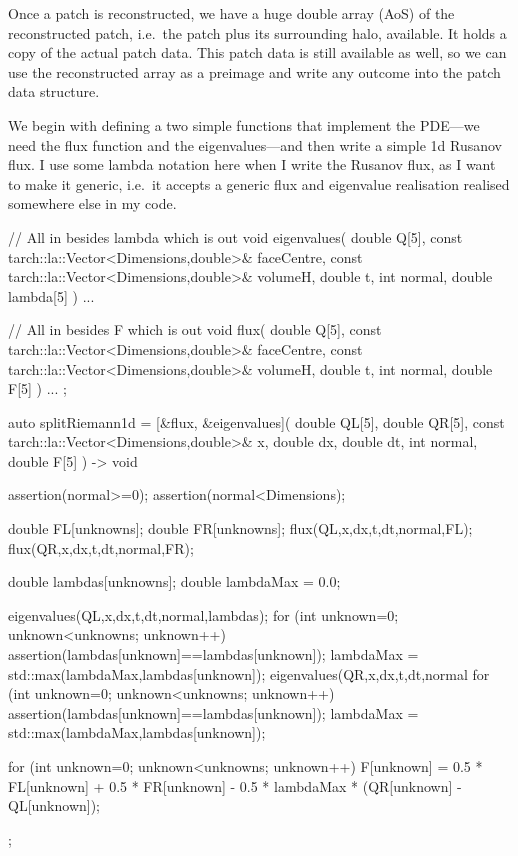 Once a patch is reconstructed, we have a huge double array (AoS) of the
reconstructed patch, i.e.~the patch plus its surrounding halo, available.
It holds a copy of the actual patch data.
This patch data is still available as well, so we can use the reconstructed
array as a preimage and write any outcome into the patch data structure.


We begin with defining a two simple functions that implement the PDE---we
need the flux function and the eigenvalues---and then write a simple 1d Rusanov flux.
I use some lambda notation here when I write the Rusanov flux, as I want to
make it generic, i.e.~it accepts a generic flux and eigenvalue realisation
realised somewhere else in my code. 




\begin{code}
// All in besides lambda which is out
void eigenvalues(
  double                                       Q[5],
  const tarch::la::Vector<Dimensions,double>&  faceCentre,
  const tarch::la::Vector<Dimensions,double>&  volumeH,
  double                                       t,
  int                                          normal,
  double                                       lambda[5]
) {
  ...
}


// All in besides F which is out
void flux(
  double                                       Q[5],
  const tarch::la::Vector<Dimensions,double>&  faceCentre,
  const tarch::la::Vector<Dimensions,double>&  volumeH,
  double                                       t,
  int                                          normal,
  double                                       F[5]
) {
  ...
};
\end{code}


\begin{code}
auto splitRiemann1d = [&flux, &eigenvalues](
  double QL[5], double QR[5], const tarch::la::Vector<Dimensions,double>& x,
  double dx, double dt, int normal, double F[5]
) -> void { 
  assertion(normal>=0);
  assertion(normal<Dimensions);

  double FL[unknowns];
  double FR[unknowns];
  flux(QL,x,dx,t,dt,normal,FL);
  flux(QR,x,dx,t,dt,normal,FR);

  double lambdas[unknowns];
  double lambdaMax = 0.0;

  eigenvalues(QL,x,dx,t,dt,normal,lambdas);
  for (int unknown=0; unknown<unknowns; unknown++) {
    assertion(lambdas[unknown]==lambdas[unknown]);
    lambdaMax = std::max(lambdaMax,lambdas[unknown]);
  }
  eigenvalues(QR,x,dx,t,dt,normal %
  for (int unknown=0; unknown<unknowns; unknown++) {
    assertion(lambdas[unknown]==lambdas[unknown]);
    lambdaMax = std::max(lambdaMax,lambdas[unknown]);
  }

  for (int unknown=0; unknown<unknowns; unknown++) {
    F[unknown] = 0.5 * FL[unknown] 
               + 0.5 * FR[unknown] 
               - 0.5 * lambdaMax * (QR[unknown] - QL[unknown]); }
};  
\end{code}

